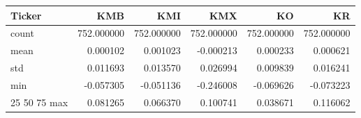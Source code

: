 \begin{tabular}{lrrrrr}
\toprule
Ticker & KMB & KMI & KMX & KO & KR \\
\midrule
count & 752.000000 & 752.000000 & 752.000000 & 752.000000 & 752.000000 \\
mean & 0.000102 & 0.001023 & -0.000213 & 0.000233 & 0.000621 \\
std & 0.011693 & 0.013570 & 0.026994 & 0.009839 & 0.016241 \\
min & -0.057305 & -0.051136 & -0.246008 & -0.069626 & -0.073223 \\
25%
50%
75%
max & 0.081265 & 0.066370 & 0.100741 & 0.038671 & 0.116062 \\
\bottomrule
\end{tabular}
